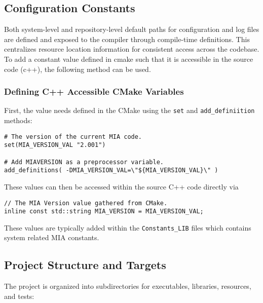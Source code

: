 \subsection{Configuration Constants}

Both system-level and repository-level default paths for configuration and log files are defined and exposed to the compiler through compile-time definitions. This centralizes resource location information for consistent access across the codebase. To add a constant value defined in cmake such that it is accessible in the source code (c++), the following method can be used.

\subsubsection{Defining C++ Accessible CMake Variables}
\label{sec:CMake-setup-cpp}

First, the value needs defined in the CMake using the \texttt{set} and \texttt{add\_definiition} methods:
\begin{lstlisting}[style=shellstyle]
# The version of the current MIA code.
set(MIA_VERSION_VAL "2.001")

# Add MIAVERSION as a preprocessor variable.
add_definitions( -DMIA_VERSION_VAL=\"${MIA_VERSION_VAL}\" )
\end{lstlisting}
These values can then be accessed within the source C++ code directly via
\begin{lstlisting}[style=cppstyle]
// The MIA Version value gathered from CMake.
inline const std::string MIA_VERSION = MIA_VERSION_VAL;
\end{lstlisting}
These values are typically added within the \texttt{Constants\_LIB} files which contains system related MIA constants. 

\subsection{Project Structure and Targets}

The project is organized into subdirectories for executables, libraries, resources, and tests:


